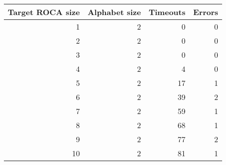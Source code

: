 \begin{tabular}{rrrr}
\toprule
 Target ROCA size &  Alphabet size &  Timeouts &  Errors \\
\midrule
                1 &              2 &         0 &       0 \\
                2 &              2 &         0 &       0 \\
                3 &              2 &         0 &       0 \\
                4 &              2 &         4 &       0 \\
                5 &              2 &        17 &       1 \\
                6 &              2 &        39 &       2 \\
                7 &              2 &        59 &       1 \\
                8 &              2 &        68 &       1 \\
                9 &              2 &        77 &       2 \\
               10 &              2 &        81 &       1 \\
\bottomrule
\end{tabular}
